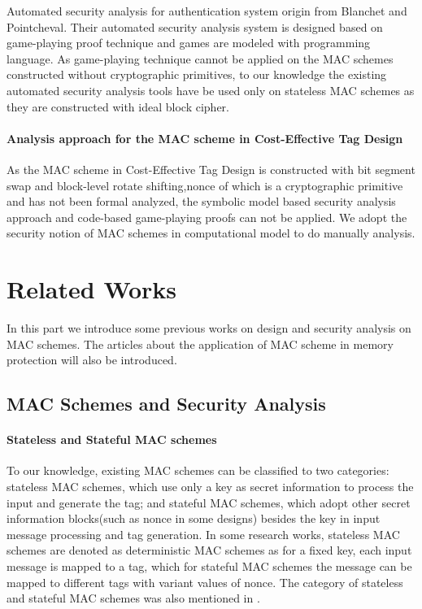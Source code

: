 \documentclass{article}
\begin{document}
Automated security analysis for authentication system origin from Blanchet and
Pointcheval\cite{blanchet2006automated}. Their automated security analysis system is designed based on
game-playing proof technique and games are modeled with programming language. As
game-playing technique cannot be applied on the MAC schemes constructed without
cryptographic primitives, to our knowledge the existing automated security analysis tools have be used only
on stateless MAC schemes as they are constructed with ideal block cipher.   
\paragraph{Analysis approach for the MAC scheme in Cost-Effective Tag Design}
As the MAC scheme in Cost-Effective Tag Design is constructed with bit segment
swap and block-level rotate shifting,nonce of which is a cryptographic primitive
and has not been formal analyzed, the symbolic model based security analysis
approach and code-based game-playing proofs can not be applied. We adopt the
security notion of MAC schemes in computational model to do manually analysis.

\section{Related Works} 
In this part we introduce some previous works on design and security analysis on MAC schemes. The articles about the application of MAC scheme in memory protection will also be introduced.
\subsection{MAC Schemes and Security Analysis}
\paragraph{Stateless and Stateful MAC schemes}
To our knowledge, existing MAC schemes can be classified to two categories:
stateless MAC schemes, which use only a key as secret information to process the
input and generate the tag; and stateful MAC schemes, which adopt other secret
information blocks(such as nonce in some designs) besides the key in input message
processing and tag generation. In some research works, stateless MAC schemes are denoted as deterministic MAC schemes as for a fixed key, each input message is mapped to a tag, which for stateful MAC schemes the message can be mapped to different tags with variant values of nonce.
The category of stateless and stateful MAC schemes was also mentioned in \cite{xor-mac}.
\end{document}
